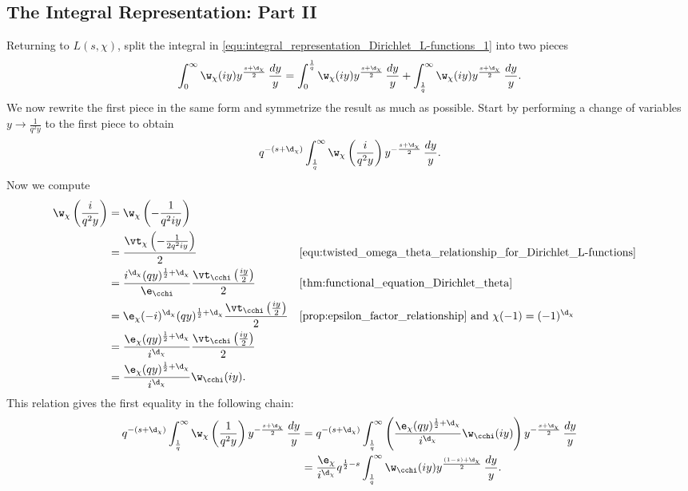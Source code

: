     \subsection*{The Integral Representation: Part II}
      Returning to $L(s,\chi)$, split the integral in \cref{equ:integral_representation_Dirichlet_L-functions_1} into two pieces
      \begin{equation}\label{equ:symmetric_integral_Dirichlet_L-functions_split}
        \int_{0}^{\infty}\w_{\chi}(iy)y^{\frac{s+\d_{\chi}}{2}}\,\frac{dy}{y} = \int_{0}^{\frac{1}{q}}\w_{\chi}(iy)y^{\frac{s+\d_{\chi}}{2}}\,\frac{dy}{y}+\int_{\frac{1}{q}}^{\infty}\w_{\chi}(iy)y^{\frac{s+\d_{\chi}}{2}}\,\frac{dy}{y}.
      \end{equation}
      We now rewrite the first piece in the same form and symmetrize the result as much as possible. Start by performing a change of variables $y \to \frac{1}{q^{2}y}$ to the first piece to obtain
      \[
        q^{-(s+\d_{\chi})}\int_{\frac{1}{q}}^{\infty}\w_{\chi}\left(\frac{i}{q^{2}y}\right)y^{-\frac{s+\d_{\chi}}{2}}\,\frac{dy}{y}.
      \]
      Now we compute
      \begin{align*}
        \w_{\chi}\left(\frac{i}{q^{2}y}\right) &= \w_{\chi}\left(-\frac{1}{q^{2}iy}\right) \\
        &= \frac{\vt_{\chi}\left(-\frac{1}{2q^{2}iy}\right)}{2} && \text{\cref{equ:twisted_omega_theta_relationship_for_Dirichlet_L-functions}} \\
        &= \frac{i^{\d_{\chi}}(qy)^{\frac{1}{2}+\d_{\chi}}}{\e_{\cchi}}\frac{\vt_{\cchi}\left(\frac{iy}{2}\right)}{2} && \text{\cref{thm:functional_equation_Dirichlet_theta}} \\
        &= \e_{\chi}(-i)^{\d_{\chi}}(qy)^{\frac{1}{2}+\d_{\chi}}\frac{\vt_{\cchi}\left(\frac{iy}{2}\right)}{2} && \text{\cref{prop:epsilon_factor_relationship} and $\chi(-1) = (-1)^{\d_{\chi}}$} \\
        &= \frac{\e_{\chi}(qy)^{\frac{1}{2}+\d_{\chi}}}{i^{\d_{\chi}}}\frac{\vt_{\cchi}\left(\frac{iy}{2}\right)}{2} \\
        &= \frac{\e_{\chi}(qy)^{\frac{1}{2}+\d_{\chi}}}{i^{\d_{\chi}}}\w_{\cchi}(iy).
      \end{align*}
      This relation gives the first equality in the following chain:
      \begin{align*}
        q^{-(s+\d_{\chi})}\int_{\frac{1}{q}}^{\infty}\w_{\chi}\left(\frac{1}{q^{2}y}\right)y^{-\frac{s+\d_{\chi}}{2}}\,\frac{dy}{y} &= q^{-(s+\d_{\chi})}\int_{\frac{1}{q}}^{\infty}\left(\frac{\e_{\chi}(qy)^{\frac{1}{2}+\d_{\chi}}}{i^{\d_{\chi}}}\w_{\cchi}(iy)\right)y^{-\frac{s+\d_{\chi}}{2}}\,\frac{dy}{y} \\
        &= \frac{\e_{\chi}}{i^{\d_{\chi}}}q^{\frac{1}{2}-s}\int_{\frac{1}{q}}^{\infty}\w_{\cchi}(iy)y^{\frac{(1-s)+\d_{\chi}}{2}}\,\frac{dy}{y}.
      \end{align*}
